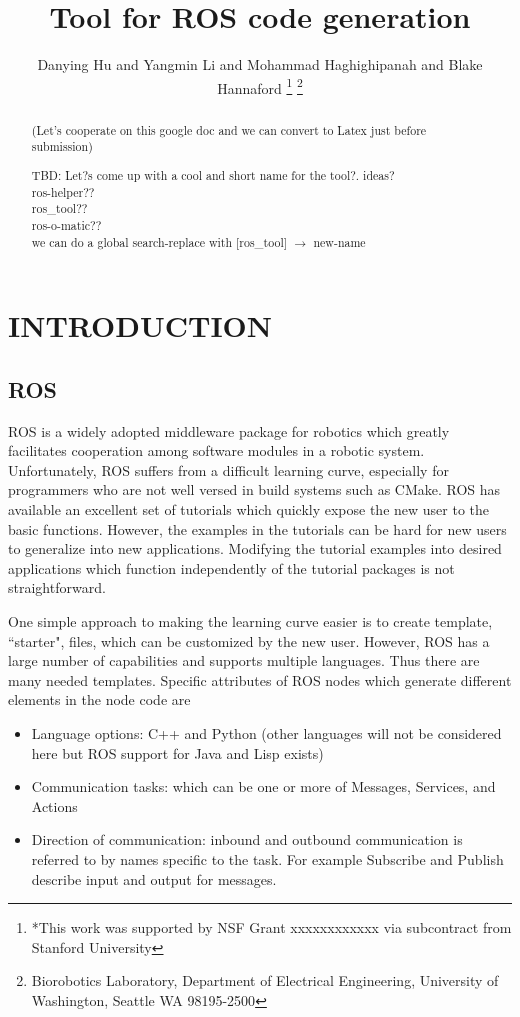 \documentclass[letterpaper, 10 pt, conference]{ieeeconf}  %
\title{\LARGE \bf
Tool for ROS code generation
}
\author{Danying Hu and Yangmin Li and Mohammad Haghighipanah and Blake Hannaford%
\thanks{*This work was  supported by NSF Grant xxxxxxxxxxxx  via subcontract from Stanford University}%
\thanks{Biorobotics Laboratory, Department of Electrical Engineering, University of Washington, Seattle WA 98195-2500}%
}
\begin{document}
\maketitle
\thispagestyle{empty}
\pagestyle{empty}


\begin{abstract}


(Let's cooperate on this google doc and we can convert to Latex just before submission)

TBD:   Let?s come up with a cool and short name for the tool?. ideas?\\
   ros-helper??\\
   ros\_tool??\\
   ros-o-matic??\\

we can do a global search-replace with  [ros\_tool] $\to$ new-name

 \vspace{2.0in}

\end{abstract}


\section{INTRODUCTION}
\subsection{ROS}
ROS\cite{xxxxx} is a widely adopted middleware package for robotics which greatly facilitates cooperation among software modules in a robotic system.   Unfortunately, ROS suffers from a difficult learning curve, especially for programmers who are not well versed in build systems such as CMake.
ROS has available an excellent set of tutorials\cite{RosTutorialsWWW} which quickly expose the new user to the basic functions.  However, the examples in the tutorials can be hard for new users to generalize into new applications.  Modifying the tutorial examples into desired applications which function independently of the tutorial packages is not straightforward.

One simple approach to making the learning curve easier is to create template, ``starter", files, which can be customized by the new user.  However, ROS has a large number of capabilities and supports multiple languages.  Thus there are many needed templates.   Specific attributes of ROS nodes which generate different elements in the node code are
\begin{itemize}
  \item Language options: C++ and Python (other languages will not be considered here but ROS support for Java and Lisp exists)
  \item Communication tasks: which can be one or more of Messages, Services, and Actions
  \item Direction of communication: inbound and outbound communication is referred to by names specific to the task. For example
  Subscribe and Publish  describe input and output  for messages.
\end{itemize}
\end{document}
